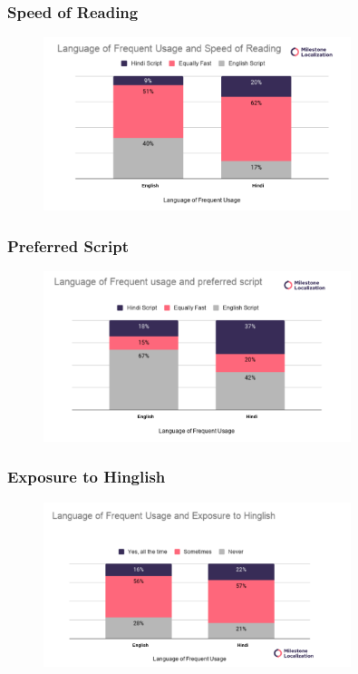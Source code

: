 \documentclass{article}
\begin{document}
\subsubsection{Speed of Reading}

\begin{figure}[H]
    \centering
    \includegraphics[width=0.8\textwidth]{plots/frequent_faster_read.png}
\end{figure}

\subsubsection{Preferred Script}

\begin{figure}[H]
    \centering
    \includegraphics[width=0.8\textwidth]{plots/frequent_preferred_script.png}
\end{figure}

\subsubsection{Exposure to Hinglish}

\begin{figure}[H]
    \centering
    \includegraphics[width=0.8\textwidth]{plots/frequent_exposure.png}
\end{figure}
\end{document}
